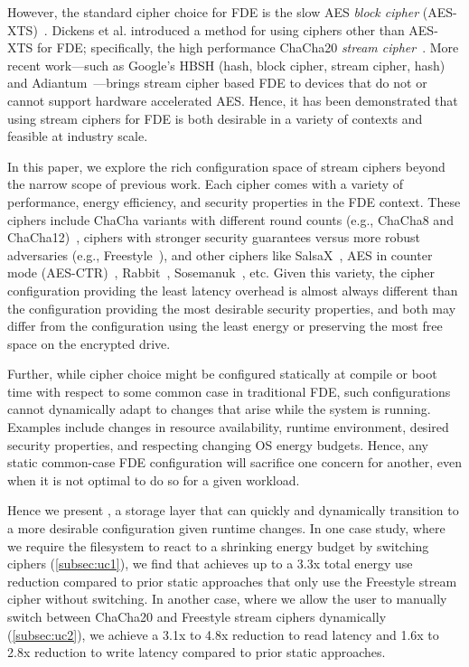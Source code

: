 However, the standard cipher choice for FDE is the slow AES \emph{block cipher}
(AES-XTS)~\cite{XTS, XTSComments, NISTXTS}. Dickens et al. introduced a method
for using ciphers other than AES-XTS for FDE; specifically, the high performance
ChaCha20 \emph{stream cipher}~\cite{StrongBox, ChaCha20}. More recent
work---such as Google's HBSH (hash, block cipher, stream cipher, hash) and
Adiantum~\cite{Adiantum}---brings stream cipher based FDE to devices that do not
or cannot support hardware accelerated AES. Hence, it has been demonstrated that
using stream ciphers for FDE is both desirable in a variety of contexts and
feasible at industry scale.

In this paper, we explore the rich configuration space of stream
ciphers beyond the narrow scope of previous work. Each cipher comes
with a variety of performance, energy efficiency, and security
properties in the FDE context.  These ciphers include ChaCha variants
with different round counts (e.g., ChaCha8 and
ChaCha12)~\cite{ChaCha20}, ciphers with stronger security guarantees
versus more robust adversaries (e.g., Freestyle~\cite{Freestyle}), and
other ciphers like SalsaX~\cite{SalsaX}, AES in counter mode
(AES-CTR)~\cite{AESCTR}, Rabbit~\cite{Rabbit},
Sosemanuk~\cite{Sosemanuk}, etc.  Given this variety, the cipher
configuration providing the least latency overhead is almost always
different than the configuration providing the most desirable security
properties, and both may differ from the configuration using the least
energy or preserving the most free space on the encrypted drive.

Further, while cipher choice might be configured statically at compile or boot
time with respect to some common case in traditional FDE, such configurations
cannot dynamically adapt to changes that arise while the system is running.
Examples include changes in resource availability, runtime environment, desired
security properties, and respecting changing OS energy budgets. Hence, any
static common-case FDE configuration will sacrifice one concern for another,
even when it is not optimal to do so for a given workload.

Hence we present \sys, a storage layer that can quickly and dynamically
transition to a more desirable configuration given runtime changes. In one case
study, where we require the filesystem to react to a shrinking energy budget by
switching ciphers (\cref{subsec:uc1}), we find that \sys achieves up to a
3.3x total energy use reduction compared to prior static approaches that only
use the Freestyle stream cipher without switching. In another case, where we
allow the user to manually switch between ChaCha20 and Freestyle stream ciphers
dynamically (\cref{subsec:uc2}), we achieve a 3.1x to 4.8x reduction to read
latency and 1.6x to 2.8x reduction to write latency compared to prior static
approaches.

